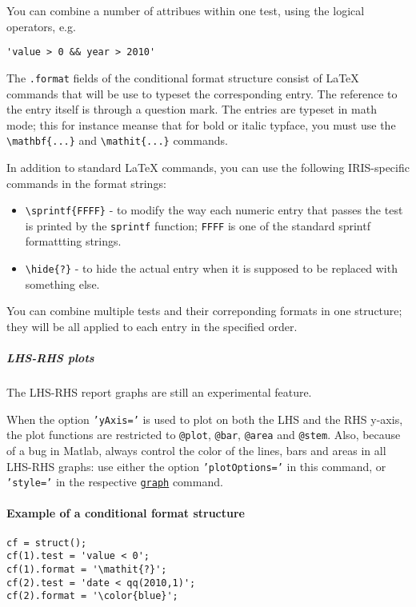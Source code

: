 You can combine a number of attribues within one test, using the logical
operators, e.g.

\begin{verbatim}
'value > 0 && year > 2010'
\end{verbatim}

The \texttt{.format} fields of the conditional format structure consist
of LaTeX commands that will be use to typeset the corresponding entry.
The reference to the entry itself is through a question mark. The
entries are typeset in math mode; this for instance meanse that for bold
or italic typface, you must use the
\texttt{\textbackslash{}mathbf\{...\}} and
\texttt{\textbackslash{}mathit\{...\}} commands.

In addition to standard LaTeX commands, you can use the following
IRIS-specific commands in the format strings:

\begin{itemize}
\item
  \texttt{\textbackslash{}sprintf\{FFFF\}} - to modify the way each
  numeric entry that passes the test is printed by the \texttt{sprintf}
  function; \texttt{FFFF} is one of the standard sprintf formattting
  strings.
\item
  \texttt{\textbackslash{}hide\{?\}} - to hide the actual entry when it
  is supposed to be replaced with something else.
\end{itemize}

You can combine multiple tests and their correponding formats in one
structure; they will be all applied to each entry in the specified
order.

\subparagraph{LHS-RHS plots}

The LHS-RHS report graphs are still an experimental feature.

When the option \texttt{'yAxis='} is used to plot on both the LHS and
the RHS y-axis, the plot functions are restricted to \texttt{@plot},
\texttt{@bar}, \texttt{@area} and \texttt{@stem}. Also, because of a bug
in Matlab, always control the color of the lines, bars and areas in all
LHS-RHS graphs: use either the option \texttt{'plotOptions='} in this
command, or \texttt{'style='} in the respective
\href{report/graph}{\texttt{graph}} command.

\paragraph{Example of a conditional format
structure}

\begin{verbatim}
cf = struct();
cf(1).test = 'value < 0';
cf(1).format = '\mathit{?}';
cf(2).test = 'date < qq(2010,1)';
cf(2).format = '\color{blue}';
\end{verbatim}


